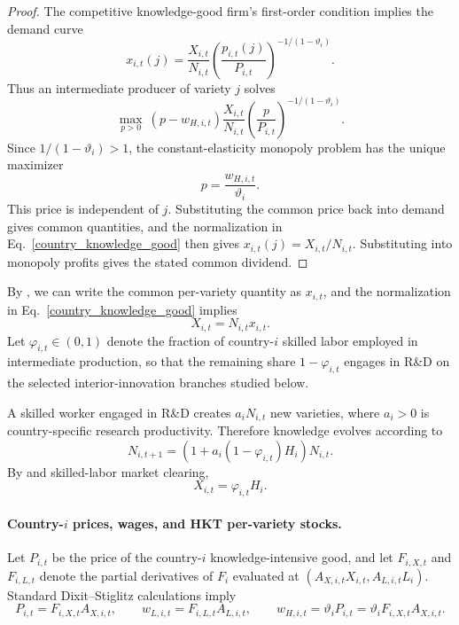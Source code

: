 \documentclass{article}
\begin{document}
\begin{proof}
The competitive knowledge-good firm's first-order condition implies the
demand curve
\[
x_{i,t}(j)
=
\frac{X_{i,t}}{N_{i,t}}
\left(\frac{p_{i,t}(j)}{P_{i,t}}\right)^{-1/(1-\vartheta_i)} .
\]
Thus an intermediate producer of variety $j$ solves
\[
\max_{p>0}
\ (p-w_{H,i,t})
\frac{X_{i,t}}{N_{i,t}}
\left(\frac{p}{P_{i,t}}\right)^{-1/(1-\vartheta_i)} .
\]
Since $1/(1-\vartheta_i)>1$, the constant-elasticity monopoly problem has
the unique maximizer
\[
p=\frac{w_{H,i,t}}{\vartheta_i}.
\]
This price is independent of $j$. Substituting the common price back into demand gives common quantities, and the normalization in Eq.~\eqref{country_knowledge_good} then gives $x_{i,t}(j)=X_{i,t}/N_{i,t}$. Substituting into monopoly profits gives the stated common dividend.
\end{proof}

By , we can write the common per-variety quantity as $x_{i,t}$, and the normalization in Eq.~\eqref{country_knowledge_good} implies
\[
X_{i,t}=N_{i,t}x_{i,t}.
\]
Let $\varphi_{i,t}\in(0,1)$ denote the fraction of country-$i$ skilled labor employed in intermediate production, so that the remaining share $1-\varphi_{i,t}$ engages in R\&D on the selected interior-innovation branches studied below.

A skilled worker engaged in R\&D creates $a_iN_{i,t}$ new varieties, where $a_i>0$ is country-specific research productivity. Therefore knowledge evolves according to
\begin{equation}\label{country_knowledge_law}
N_{i,t+1}=(1+a_i(1-\varphi_{i,t})H_i)N_{i,t}.
\end{equation}
By  and skilled-labor market clearing,
\begin{equation}\label{country_X_phi}
X_{i,t}=\varphi_{i,t}H_i.
\end{equation}

\paragraph{Country-$i$ prices, wages, and HKT per-variety stocks.}
Let $P_{i,t}$ be the price of the country-$i$ knowledge-intensive good, and let $F_{i,X,t}$ and $F_{i,L,t}$ denote the partial derivatives of $F_i$ evaluated at $(A_{X,i,t}X_{i,t},A_{L,i,t}L_i)$. Standard Dixit--Stiglitz calculations imply
\begin{equation}\label{country_factor_prices}
P_{i,t}=F_{i,X,t}A_{X,i,t},
\qquad
w_{L,i,t}=F_{i,L,t}A_{L,i,t},
\qquad
w_{H,i,t}=\vartheta_i P_{i,t}=\vartheta_i F_{i,X,t}A_{X,i,t}.
\end{equation}
\end{document}
